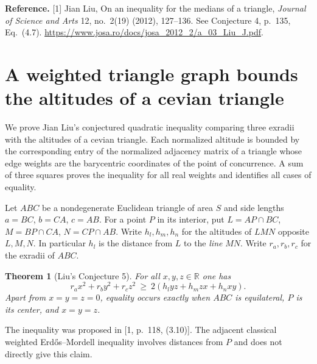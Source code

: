\documentclass[11pt,a4paper]{article}
\numberwithin{equation}{section}
\newtheorem{theorem}{Theorem}[section]
\theoremstyle{definition}
\theoremstyle{remark}
\newenvironment{sectionabstract}{\par\smallskip\begingroup\small\noindent}{\par\endgroup\medskip}
\begin{document}
\textbf{Reference.} [1] Jian Liu, On an inequality for the medians of a
triangle, \emph{Journal of Science and Arts} 12, no.~2(19) (2012), 127--136.
See Conjecture 4, p.~135, Eq.~(4.7).
\url{https://www.josa.ro/docs/josa_2012_2/a_03_Liu_J.pdf}.

\par\endgroup

\begingroup
\newcommand{\cyc}{\sum_{\mathrm{cyc}}}
\section{\texorpdfstring{A weighted triangle graph bounds the altitudes of a cevian triangle}{A weighted triangle graph bounds the altitudes of a cevian triangle}}\label{section:r39keio}
\par\medskip


\begin{sectionabstract}
We prove Jian Liu's conjectured quadratic inequality comparing three exradii with the altitudes of a cevian triangle. Each normalized altitude is bounded by the corresponding entry of the normalized adjacency matrix of a triangle whose edge weights are the barycentric coordinates of the point of concurrence. A sum of three squares proves the inequality for all real weights and identifies all cases of equality.
\end{sectionabstract}
Let $ABC$ be a nondegenerate Euclidean triangle of area $S$ and side lengths $a=BC$, $b=CA$, $c=AB$. For a point $P$ in its interior, put $L=AP\cap BC$, $M=BP\cap CA$, $N=CP\cap AB$. Write $h_l,h_m,h_n$ for the altitudes of $LMN$ opposite $L,M,N$. In particular $h_l$ is the distance from $L$ to the \emph{line} $MN$. Write $r_a,r_b,r_c$ for the exradii of $ABC$.

\begin{theorem}[Liu's Conjecture 5]
For all $x,y,z\in\mathbb R$ one has
\[
     r_ax^2+r_by^2+r_cz^2\ \ge\ 2(h_l yz+h_m zx+h_n xy).
\]
Apart from $x=y=z=0$, equality occurs exactly when $ABC$ is equilateral, $P$ is its center, and $x=y=z$.
\end{theorem}
The inequality was proposed in [1, p.~118, (3.10)]. The adjacent classical weighted Erd\H os--Mordell inequality involves distances from $P$ and does not directly give this claim.
\end{document}
